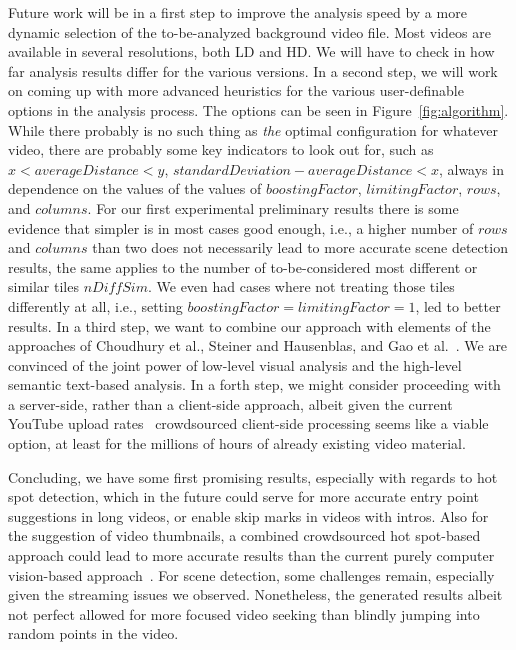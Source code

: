 \documentclass[10pt,twocolumn,letterpaper]{article}
\begin{document}
Future work will be in a first step to improve the analysis speed by a more dynamic selection of the to-be-analyzed background video file. Most videos are available in several resolutions, both LD and HD. We will have to check in how far analysis results differ for the various versions. In a second step, we will work on coming up with more advanced heuristics for the various user-definable options in the analysis process. The options can be seen in Figure~\ref{fig:algorithm}. While there probably is no such thing as \emph{the} optimal configuration for whatever video, there are probably some key indicators to look out for, such as $x < averageDistance  < y$, $standardDeviation - averageDistance < x$, always in dependence on the values of the values of $boostingFactor$, $limitingFactor$, $rows$, and $columns$. For our first experimental preliminary results there is some evidence that simpler is in most cases good enough, i.e., a higher number of $rows$ and $columns$ than two does not necessarily lead to more accurate scene detection results, the same applies to the number of to-be-considered most different or similar tiles $nDiffSim$. We even had cases where not treating those tiles differently at all, i.e., setting $boostingFactor  = limitingFactor = 1$, led to better results. In a third step, we want to combine our approach with elements of the approaches of Choudhury et al., Steiner and Hausenblas, and Gao et al.~\cite{Choudhury:YouTube,Gao:2009,semwebvid}. We are convinced of the joint power of low-level visual analysis and the high-level semantic text-based analysis. In a forth step, we might consider proceeding with a server-side, rather than a client-side approach, albeit given the current YouTube upload rates~\cite{youtube:stats} crowdsourced client-side processing seems like a viable option, at least for the millions of hours of already existing video material.

Concluding, we have some first promising results, especially with regards to hot spot detection, which in the future could serve for more accurate entry point suggestions in long videos, or enable skip marks in videos with intros. Also for the suggestion of video thumbnails, a combined crowdsourced hot spot-based approach could lead to more accurate results than the current purely computer vision-based approach~\cite{googleresearch}. For scene detection, some challenges remain, especially given the streaming issues we observed. Nonetheless, the generated results albeit not perfect allowed for more focused video seeking than blindly jumping into random points in the video.

{\small


}
\end{document}
